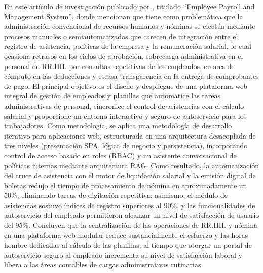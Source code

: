 En este artículo de investigación publicado por \textcite{someswari2025employee}, titulado ``Employee Payroll and Management System'', 
donde mencionan que tiene como problemática que la administración convencional de recursos humanos y nóminas se efectúa mediante procesos manuales o semiautomatizados que carecen de integración 
entre el registro de asistencia, 
políticas de la empresa y la remuneración salarial, lo cual ocasiona retrasos en los ciclos de aprobación, sobrecarga administrativa en el personal de RR.HH. por consultas repetitivas de los empleados, 
errores de cómputo en las deducciones y escasa transparencia en la entrega de comprobantes de pago. 
El principal objetivo es el diseño y despliegue de una plataforma web integral de gestión de empleados y planillas que automatice las tareas administrativas de personal, 
sincronice el control de asistencias con el cálculo salarial y proporcione un entorno interactivo y seguro de autoservicio para los trabajadores. Como metodología, 
se aplica una metodología de desarrollo iterativo para aplicaciones web, estructurada en una arquitectura desacoplada de tres niveles (presentación SPA, lógica de negocio y persistencia), 
incorporando control de acceso basado en roles (RBAC) y un asistente conversacional de políticas internas mediante arquitectura RAG. Como resultado, 
la automatización del cruce de asistencia con el motor de liquidación salarial y la emisión digital de boletas redujo el tiempo de procesamiento de nómina en aproximadamente un 50\%, 
eliminando tareas de digitación repetitiva; asimismo, el módulo de asistencias sostuvo índices de registro superiores al 90\%,
y las funcionalidades de autoservicio del empleado permitieron alcanzar un nivel de satisfacción de usuario del 95\%. Concluyen que la centralización de las operaciones de RR.HH. 
y nómina en una plataforma web modular reduce sustancialmente el esfuerzo y las horas hombre dedicadas al cálculo de las planillas, 
al tiempo que otorgar un portal de autoservicio seguro al empleado incrementa su nivel de satisfacción laboral y libera a las áreas contables de cargas administrativas rutinarias.


